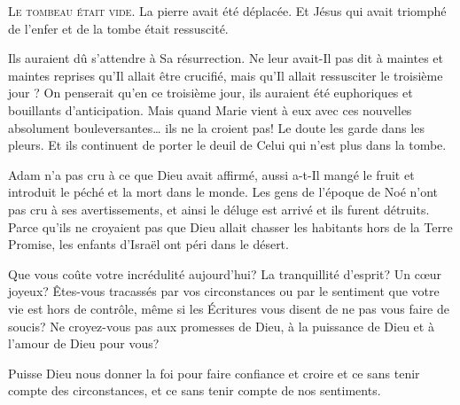 

\lettrine{L}{e tombeau était vide.} La pierre avait été déplacée.
 Et Jésus \ocadr qui avait triomphé de l'enfer et de la tombe \fcadr{}
 était ressuscité.

Ils auraient dû s'attendre à Sa résurrection.
 Ne leur avait-Il pas dit à maintes et maintes reprises
 qu'Il allait être crucifié, mais qu'Il allait ressusciter le troisième jour ?
 On penserait qu'en ce troisième jour, ils auraient été euphoriques
 et bouillants  d'anticipation.
 Mais quand Marie vient à eux avec ces nouvelles absolument
 bouleversantes\dots{} ils ne la croient pas!
 Le doute les garde dans les pleurs. Et ils continuent de porter
 le deuil de Celui qui n'est plus dans la tombe.


Adam n'a pas cru à ce que Dieu avait affirmé, aussi a-t-Il mangé
 le fruit et introduit le péché et la mort dans le monde.
 Les gens de l'époque de Noé n'ont pas cru à ses avertissements,
 et ainsi le déluge est arrivé et ils furent détruits.
 Parce qu'ils ne croyaient pas que Dieu allait chasser les habitants
 hors de la Terre Promise, les enfants d'Israël ont péri dans le désert.

Que vous coûte votre incrédulité aujourd'hui?
 La tranquillité d'esprit? Un cœur joyeux?
 Êtes-vous tracassés par vos circonstances ou par le sentiment
 que votre vie est hors de contrôle, même si les Écritures vous disent
 de ne pas vous faire de soucis? Ne croyez-vous pas aux promesses de Dieu,
 à la puissance de Dieu et à l'amour de Dieu pour vous?

Puisse Dieu nous donner la foi pour faire confiance et croire
 \ocadr et ce sans tenir compte des circonstances,
 et ce sans tenir compte de nos sentiments.

\dvrule





